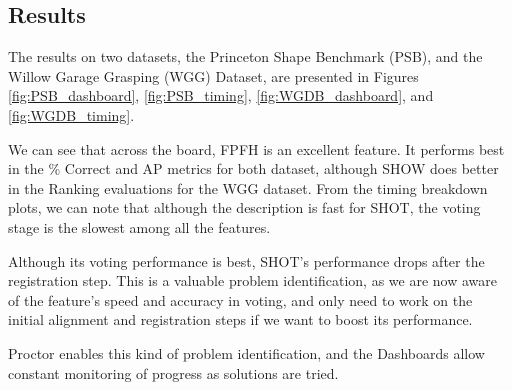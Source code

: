 \subsection{Results}
The results on two datasets, the Princeton Shape Benchmark (PSB), and the Willow Garage Grasping (WGG) Dataset, are presented in Figures \ref{fig:PSB_dashboard}, \ref{fig:PSB_timing}, \ref{fig:WGDB_dashboard}, and \ref{fig:WGDB_timing}.

We can see that across the board, FPFH is an excellent feature.
It performs best in the \% Correct and AP metrics for both dataset, although SHOW does better in the Ranking evaluations for the WGG dataset.
From the timing breakdown plots, we can note that although the description is fast for SHOT, the voting stage is the slowest among all the features.

Although its voting performance is best, SHOT's performance drops after the registration step.
This is a valuable problem identification, as we are now aware of the feature's speed and accuracy in voting, and only need to work on the initial alignment and registration steps if we want to boost its performance.

Proctor enables this kind of problem identification, and the Dashboards allow constant monitoring of progress as solutions are tried.
